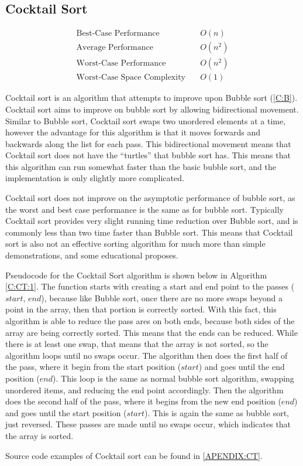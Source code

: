 \documentclass{subfile}
\begin{document}
\subsection{Cocktail Sort}\label{C:CT}
\begin{align*}
  \text{Best-Case Performance}\quad &O\left(n\right)\\
  \text{Average Performance}\quad &O\left(n^{2}\right)\\
  \text{Worst-Case Performance}\quad &O\left(n^{2}\right)\\
  \text{Worst-Case Space Complexity}\quad &O\left(1\right)
\end{align*}
\begin{multicols}{2}
  Cocktail sort is an algorithm that attempts to improve upon Bubble sort (\ref{C:B}). Cocktail sort aims to improve on bubble sort by allowing bidirectional movement. Similar to Bubble sort, Cocktail sort swaps two unordered elements at a time, however the advantage for this algorithm is that it moves forwards and backwards along the list for each pass. This bidirectional movement means that Cocktail sort does not have the ``turtles'' that bubble sort has. This means that this algorithm can run somewhat faster than the basic bubble sort, and the implementation is only slightly more complicated.
  \par
  Cocktail sort does not improve on the asymptotic performance of bubble sort, as the worst and best case performance is the same as for bubble sort. Typically Cocktail sort provides very slight running time reduction over Bubble sort, and is commonly less than two time faster than Bubble sort. This means that Cocktail sort is also not an effective sorting algorithm for much more than simple demonstrations, and some educational proposes. 
  \par
  Pseudocode for the Cocktail Sort algorithm is shown below in Algorithm \ref{C:CT:1}. The function starts with creating a start and end point to the passes ($start$, $end$), because like Bubble sort, once there are no more swaps beyond a point in the array, then that portion is correctly sorted. With this fact, this algorithm is able to reduce the pass ares on both ends, because both sides of the array are being correctly sorted. This means that the ends can be reduced. While there is at least one swap, that means that the array is not sorted, so the algorithm loops until no swaps occur. The algorithm then does the first half of the pass, where it begin from the start position ($start$) and goes until the end position ($end$). This loop is the same as normal bubble sort algorithm, swapping unordered items, and reducing the end point accordingly. Then the algorithm does the second half of the pass, where it begins from the new end position ($end$) and goes until the start position ($start$). This is again the same as bubble sort, just reversed. These passes are made until no swaps occur, which indicates that the array is sorted.
  \par
  Source code examples of Cocktail sort can be found in \ref{APENDIX:CT}.
\end{multicols}
\end{document}
